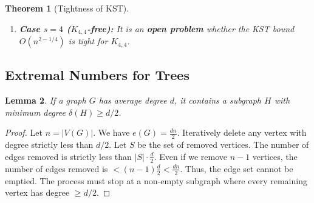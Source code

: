\documentclass[a4paper]{article}
\newtheorem{thm}{Theorem}[section]
\newtheorem{lem}[thm]{Lemma}
\begin{document}
\begin{thm}[Tightness of KST]
\begin{enumerate}
        \item \textbf{Case $s=4$ ($K_{4,4}$-free):}
        It is an \textbf{open problem} whether the KST bound $O(n^{2 - 1/4})$ is tight for $K_{4,4}$.
    \end{enumerate}
\end{thm}

\subsection{Extremal Numbers for Trees}

\begin{lem}
    If a graph $G$ has average degree $d$, it contains a subgraph $H$ with minimum degree $\delta(H) \geq d/2$.
\end{lem}
\begin{proof}
        Let $n = |V(G)|$. We have $e(G) = \frac{dn}{2}$.
        Iteratively delete any vertex with degree strictly less than $d/2$.
        Let $S$ be the set of removed vertices. The number of edges removed is strictly less than $|S| \cdot \frac{d}{2}$.
        Even if we remove $n-1$ vertices, the number of edges removed is $< (n-1)\frac{d}{2} < \frac{dn}{2}$.
        Thus, the edge set cannot be emptied. The process must stop at a non-empty subgraph where every remaining vertex has degree $\geq d/2$.
\end{proof}
\end{document}
